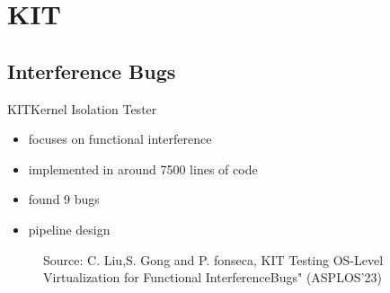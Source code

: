 \section{KIT}
\subsection{Interference Bugs}
\begin{frame}{KIT}{Kernel Isolation Tester}
\begin{itemize}
    \setlength\itemsep{1em}
    \item focuses on functional interference
    \item implemented in around 7500 lines of code 
    \item found 9 bugs
    \item pipeline design
\end{itemize}
\begin{figure}[hb]
    \centering
\def\stackalignment{l}
           {\scriptsize
            Source: C. Liu,S. Gong and P. fonseca, KIT  Testing OS-Level Virtualization for Functional InterferenceBugs" (ASPLOS'23)}
    \end{figure}
\end{frame}